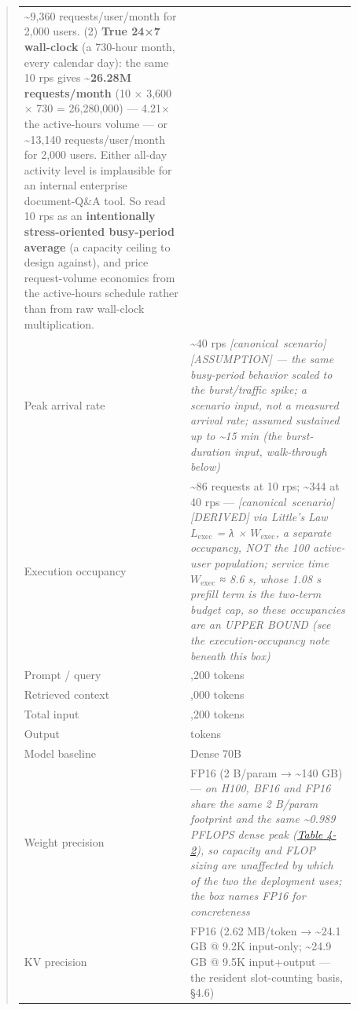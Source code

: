\begin{quote}
\begin{longtable}[]{@{}
  >{\raggedright\arraybackslash}p{0.4527\linewidth}
  >{\raggedright\arraybackslash}p{0.4527\linewidth}@{}}
\textasciitilde9,360 requests/user/month for 2,000 users. (2)
\textbf{True 24×7 wall-clock} (a 730-hour month, every calendar day):
the same 10 rps gives \textbf{\textasciitilde26.28M requests/month} (10
× 3,600 × 730 = 26,280,000) --- 4.21× the active-hours volume --- or
\textasciitilde13,140 requests/user/month for 2,000 users. Either
all-day activity level is implausible for an internal enterprise
document-Q\&A tool. So read 10 rps as an \textbf{intentionally
stress-oriented busy-period average} (a capacity ceiling to design
against), and price request-volume economics from the active-hours
schedule rather than from raw wall-clock multiplication. \\
Peak arrival rate & \textasciitilde40 rps \emph{\mbox{{[}canonical
scenario{]}}\hspace{0pt}\mbox{{[}ASSUMPTION{]}} --- the same busy-period behavior scaled to
the burst/traffic spike; a scenario input, not a measured arrival rate;
assumed sustained up to \textasciitilde15 min (the burst-duration input,
walk-through below)} \\
Execution occupancy & \textasciitilde86 requests at 10 rps;
\textasciitilde344 at 40 rps --- \emph{\mbox{{[}canonical
scenario{]}}\hspace{0pt}\mbox{{[}DERIVED{]}} via Little's Law \(L_{\mathrm{exec}}\) = λ ×
\(W_{\mathrm{exec}}\), a separate occupancy, NOT the 100 active-user
population; service time \(W_{\mathrm{exec}}\) ≈ 8.6 s, whose 1.08 s
prefill term is the two-term budget cap, so these occupancies are an
UPPER BOUND (see the execution-occupancy note beneath this box)} \\
Prompt / query & 1,200 tokens \\
Retrieved context & 8,000 tokens \\
Total input & 9,200 tokens \\
Output & 300 tokens \\
Model baseline & Dense 70B \\
Weight precision & FP16 (2 B/param → \textasciitilde140 GB) --- \emph{on
H100, BF16 and FP16 share the same 2 B/param footprint and the same
\textasciitilde0.989 PFLOPS dense peak (\hyperref[tab:4.2]{Table 4-2}), so capacity and FLOP
sizing are unaffected by which of the two the deployment uses; the box
names FP16 for concreteness} \\
KV precision & FP16 (2.62 MB/token → \textasciitilde24.1 GB @ 9.2K
input-only; \textasciitilde24.9 GB @ 9.5K input+output --- the resident
slot-counting basis, §4.6) \\

\end{longtable}
\end{quote}
